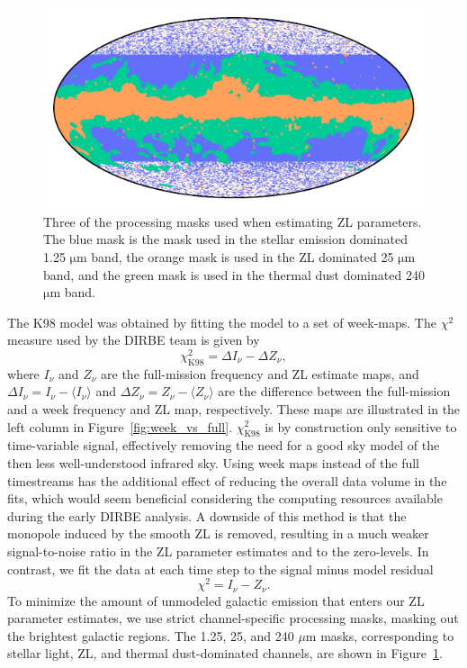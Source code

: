 \documentclass[twocolumn]{aa}
\begin{document}
\begin{figure}
    \centering
    \includegraphics[width=\columnwidth]{figs/zodi_proc_masks.pdf}
    \caption{Three of the processing masks used when estimating ZL parameters. The blue mask is the 
    mask used in the stellar emission dominated 1.25 $\mathrm{\mu m}$ band, the orange mask is used 
    in the ZL dominated 25 $\mathrm{\mu m}$ band, and the green mask is used in the thermal dust dominated 
    240 $\mathrm{\mu m}$ band.}
    \label{fig:zodi-procmask}
\end{figure}
The K98 model was obtained by fitting the model to a set of week-maps. 
The $\chi^2$ measure used by the DIRBE team is given by
\begin{equation}
    \chi^2_\mathrm{K98} = \Delta I_\nu - \Delta Z_\nu,
\end{equation}
where $I_\nu$ and $Z_\nu$ are the full-mission frequency and ZL estimate 
maps, and $\Delta I_\nu = I_\nu - \langle I_\nu \rangle$ and $\Delta Z_\nu = Z_\nu - \langle Z_\nu \rangle$ are the difference between 
the full-mission and a week frequency and ZL map, respectively. These 
maps are illustrated in the left column in Figure~\ref{fig:week_vs_full}. 
$\chi^2_\mathrm{K98}$ is by construction only sensitive to time-variable 
signal, effectively removing the need for a good sky model of the then 
less well-understood infrared sky. Using week maps instead of the full 
timestreams has the additional effect of reducing the overall data 
volume in the fits, which would seem beneficial considering the 
computing resources available during the early DIRBE analysis. A 
downside of this method is that the monopole induced by the smooth ZL is 
removed, resulting in a much weaker signal-to-noise ratio in the ZL 
parameter estimates and to the zero-levels. In contrast, we fit the data 
at each time step to the signal minus model residual
\begin{equation}\label{eq:chisq}
    \chi^2 = I_\nu - Z_\nu.
\end{equation}
To minimize the amount of unmodeled galactic emission that enters our 
ZL parameter estimates, we use strict channel-specific processing masks, 
masking out the brightest galactic regions. The 1.25, 25, and 240 $\mu$m 
masks, corresponding to stellar light, ZL, and thermal dust-dominated 
channels, are shown in Figure~\ref{fig:zodi-procmask}.
\end{document}
